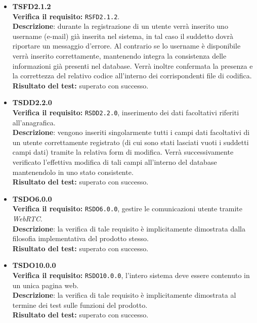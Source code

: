 \begin{itemize}
\item \textbf{TSFD2.1.2}\\
\textbf{Verifica il requisito:} \texttt{RSFD2.1.2}.\\
\textbf{Descrizione}: durante la registrazione di un utente  verrà inserito uno username (e-mail) già inserita nel sistema, in tal caso il suddetto dovrà riportare un messaggio d'errore. Al contrario se lo username è disponibile verrà inserito correttamente, mantenendo integra la consistenza delle informazioni già presenti nel database. Verrà inoltre confermata la presenza e la correttezza  del relativo codice all'interno dei corrispondenti file di codifica.\\
\textbf{Risultato del test:} superato con successo.

\item \textbf{TSDD2.2.0}\\
\textbf{Verifica il requisito:} \texttt{RSDD2.2.0}, inserimento dei dati facoltativi riferiti all'anagrafica.\\
\textbf{Descrizione}: vengono inseriti singolarmente tutti i campi dati facoltativi di un utente  correttamente registrato (di cui sono stati lasciati vuoti i suddetti campi dati) tramite la relativa form di modifica. Verrà successivamente verificato l'effettiva modifica di tali campi all'interno del database mantenendolo in uno stato consistente.\\
\textbf{Risultato del test:} superato con successo.


\item \textbf{TSDO6.0.0}\\
\textbf{Verifica il requisito:} \texttt{RSDO6.0.0}, gestire le comunicazioni utente tramite \textit{WebRTC}.\\
\textbf{Descrizione}: la verifica di tale requisito è implicitamente dimostrata dalla filosofia implementativa del prodotto stesso.\\
\textbf{Risultato del test:} superato con successo.

\item \textbf{TSDO10.0.0}\\
\textbf{Verifica il requisito:} \texttt{RSDO10.0.0}, l'intero sistema deve essere contenuto in un unica pagina web.\\
\textbf{Descrizione}: la verifica di tale requisito è implicitamente dimostrata al termine dei test sulle funzioni del prodotto.\\
\textbf{Risultato del test:} superato con successo.


\end{itemize}
